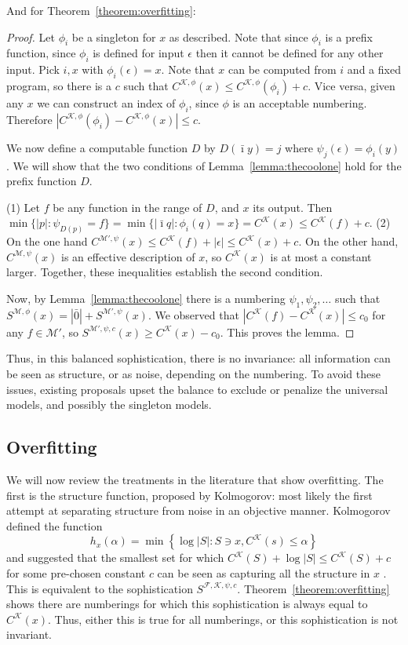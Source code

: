 \documentclass{style/llncs}
\newcommand{\M}{\mathscr M}
\newcommand{\F}{\mathscr F}
\newcommand{\K}{\mathscr K}
\newcommand{\s}{S}
\begin{document}
And for Theorem~\ref{theorem:overfitting}:

\begin{proof}
Let $\phi_i$ be a singleton for $x$ as described. Note that since $\phi_i$ is a prefix function, since $\phi_i$ is defined for input $\epsilon$ then it cannot be defined for any other input. Pick $i,x$ with $\phi_i(\epsilon)=x$. Note that $x$ can be computed from $i$ and a fixed program, so there is a $c$ such that $C^{\K, \phi}(x)\le C^{\K, \phi}(\phi_i)+c$. Vice versa, given any $x$ we can construct an index of $\phi_i$, since $\phi$ is an acceptable numbering. Therefore $|C^{\K,\phi}(\phi_i)-C^{\K, \phi}(x)|\le c$.

We now define a computable function $D$ by $D(\bar\imath y)=j$ where $\psi_j(\epsilon) = \phi_i(y)$.  We will show that the two conditions of Lemma~\ref{lemma:thecoolone} hold for the prefix function $D$.

(1) Let $f$ be any function in the range of $D$, and $x$ its output. Then $\min\{|p|:\psi_{D(p)}=f\}=\min\{|\bar\imath q|:\phi_i(q)=x\}=C^{\K}(x) \le C^{\K}(f)+c$. (2) On the one hand $C^{\M',\psi}(x)\le C^\K(f)+|\epsilon|\le C^\K(x)+c$. On the other hand, $C^{\M,\psi}(x)$ is an effective description of $x$, so $C^{\K}(x)$ is at most a constant larger. Together, these inequalities establish the second condition.

Now, by Lemma~\ref{lemma:thecoolone} there is a numbering $\psi_1,\psi_2,\ldots$ such that $\s^{\M,\phi}(x)=|\bar 0|+S^{\M',\psi}(x)$. We observed that $|C^{\K}(f)-C^{\K}(x)|\le c_0$ for any $f\in\M'$, so $\s^{\M',\psi, c}(x)\ge C^{\K}(x)-c_0$. This proves the lemma.
\end{proof}

\noindent Thus, in this balanced sophistication, there is no invariance: all information can be seen as structure, or as noise, depending on the numbering. To avoid these issues, existing proposals upset the balance to exclude or penalize the universal models, and possibly the singleton models. 

\subsection{Overfitting}

We will now review the treatments in the literature that show overfitting. The first is the structure function, proposed by Kolmogorov: most likely the first attempt at separating structure from noise in an objective manner. Kolmogorov defined the function
\[
h_x(\alpha) = \min \left \{\log |S| : S \ni x, C^\K(s) \leq \alpha \right \} 
\]
and suggested that the smallest set for which $C^\K(S) + \log|S| \leq C^\K(S) + c$ for some pre-chosen constant $c$ can be seen as capturing all the structure in $x$ \cite{cover1985kolmogorov}. This is equivalent to the sophistication $\s^{\F,\K,\psi,c}$. Theorem~\ref{theorem:overfitting} shows  there are numberings for which this sophistication is always equal to $C^\K(x)$. Thus, either this is true for all numberings, or this sophistication is not invariant. 
 
\end{document}
